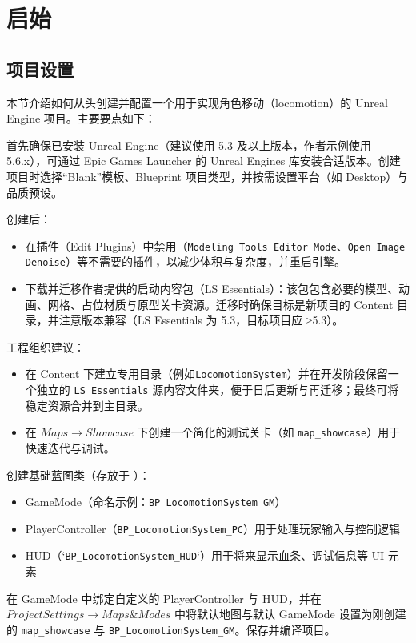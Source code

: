 \documentclass[10pt,CJKmath]{zhbook-v1}
\newcommand{\il}[1]{\texttt{#1}}%
\begin{document}

\mainmatter
\pagestyle{fancy}

\chapter{启始}
\section{项目设置}

本节介绍如何从头创建并配置一个用于实现角色移动（locomotion）的 Unreal Engine 项目。主要要点如下：

首先确保已安装 Unreal Engine（建议使用 5.3 及以上版本，作者示例使用 5.6.x），可通过 Epic Games Launcher 的 Unreal Engines 库安装合适版本。创建项目时选择“Blank”模板、Blueprint 项目类型，并按需设置平台（如 Desktop）与品质预设。

创建后：
\begin{itemize}
\item 在插件（Edit \faArrowAltCircleRight Plugins）中禁用（\il{Modeling Tools Editor Mode}、\il{Open Image Denoise}）等不需要的插件，以减少体积与复杂度，并重启引擎。
\item 下载并迁移作者提供的启动内容包（LS Essentials）：该包包含必要的模型、动画、网格、占位材质与原型关卡资源。迁移时确保目标是新项目的 Content 目录，并注意版本兼容（LS Essentials 为 5.3，目标项目应 ≥5.3）。
\end{itemize}
工程组织建议：
\begin{itemize}
\item 在 Content 下建立专用目录（例如\il{LocomotionSystem}）并在开发阶段保留一个独立的 \il{LS_Essentials} 源内容文件夹，便于日后更新与再迁移；最终可将稳定资源合并到主目录。
\item 在 $Maps \rightarrow Showcase$ 下创建一个简化的测试关卡（如 \il{map_showcase}）用于快速迭代与调试。
\end{itemize}
创建基础蓝图类（存放于 ）：
\begin{itemize}
\item  GameMode（命名示例：\il{BP_LocomotionSystem_GM}）
\item  PlayerController（\il{BP_LocomotionSystem_PC}）用于处理玩家输入与控制逻辑
\item  HUD（`\il{BP_LocomotionSystem_HUD}`）用于将来显示血条、调试信息等 UI 元素
\end{itemize}
在 GameMode 中绑定自定义的 PlayerController 与 HUD，并在 $Project Settings \rightarrow Maps \& Modes$ 中将默认地图与默认 GameMode 设置为刚创建的 \il{map_showcase} 与 \il{BP_LocomotionSystem_GM}。保存并编译项目。
\end{document}
